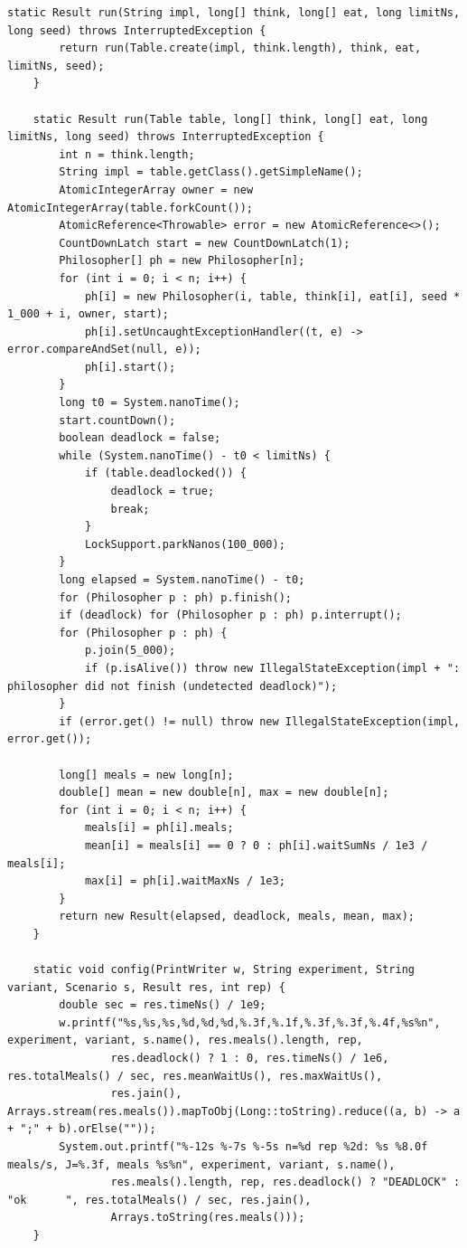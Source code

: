 \documentclass[11pt,a4paper]{article}
\begin{document}
\begin{lstlisting}[caption={Klasa \textbf{Main} (\texttt{src/Main.java})}]
    static Result run(String impl, long[] think, long[] eat, long limitNs, long seed) throws InterruptedException {
        return run(Table.create(impl, think.length), think, eat, limitNs, seed);
    }

    static Result run(Table table, long[] think, long[] eat, long limitNs, long seed) throws InterruptedException {
        int n = think.length;
        String impl = table.getClass().getSimpleName();
        AtomicIntegerArray owner = new AtomicIntegerArray(table.forkCount());
        AtomicReference<Throwable> error = new AtomicReference<>();
        CountDownLatch start = new CountDownLatch(1);
        Philosopher[] ph = new Philosopher[n];
        for (int i = 0; i < n; i++) {
            ph[i] = new Philosopher(i, table, think[i], eat[i], seed * 1_000 + i, owner, start);
            ph[i].setUncaughtExceptionHandler((t, e) -> error.compareAndSet(null, e));
            ph[i].start();
        }
        long t0 = System.nanoTime();
        start.countDown();
        boolean deadlock = false;
        while (System.nanoTime() - t0 < limitNs) {
            if (table.deadlocked()) {
                deadlock = true;
                break;
            }
            LockSupport.parkNanos(100_000);
        }
        long elapsed = System.nanoTime() - t0;
        for (Philosopher p : ph) p.finish();
        if (deadlock) for (Philosopher p : ph) p.interrupt();
        for (Philosopher p : ph) {
            p.join(5_000);
            if (p.isAlive()) throw new IllegalStateException(impl + ": philosopher did not finish (undetected deadlock)");
        }
        if (error.get() != null) throw new IllegalStateException(impl, error.get());

        long[] meals = new long[n];
        double[] mean = new double[n], max = new double[n];
        for (int i = 0; i < n; i++) {
            meals[i] = ph[i].meals;
            mean[i] = meals[i] == 0 ? 0 : ph[i].waitSumNs / 1e3 / meals[i];
            max[i] = ph[i].waitMaxNs / 1e3;
        }
        return new Result(elapsed, deadlock, meals, mean, max);
    }

    static void config(PrintWriter w, String experiment, String variant, Scenario s, Result res, int rep) {
        double sec = res.timeNs() / 1e9;
        w.printf("%s,%s,%s,%d,%d,%d,%.3f,%.1f,%.3f,%.3f,%.4f,%s%n", experiment, variant, s.name(), res.meals().length, rep,
                res.deadlock() ? 1 : 0, res.timeNs() / 1e6, res.totalMeals() / sec, res.meanWaitUs(), res.maxWaitUs(),
                res.jain(), Arrays.stream(res.meals()).mapToObj(Long::toString).reduce((a, b) -> a + ";" + b).orElse(""));
        System.out.printf("%-12s %-7s %-5s n=%d rep %2d: %s %8.0f meals/s, J=%.3f, meals %s%n", experiment, variant, s.name(),
                res.meals().length, rep, res.deadlock() ? "DEADLOCK" : "ok      ", res.totalMeals() / sec, res.jain(),
                Arrays.toString(res.meals()));
    }


\end{lstlisting}
\end{document}
